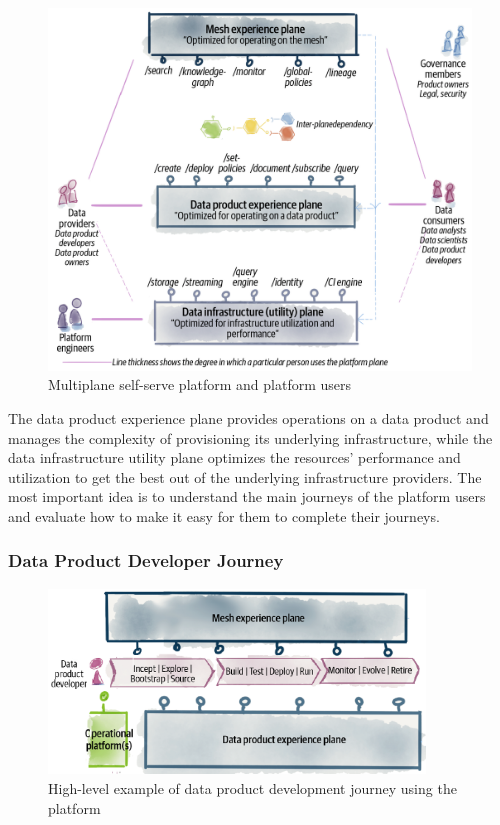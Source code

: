 \documentclass[12pt, a4paper]{book}
\begin{document}
\begin{figure}[h]
	\begin{framed}
		\centering
		\includegraphics[width=12cm]{multiplane.png}
		\caption{Multiplane self-serve platform and platform users}
		\label{multiplane}
	\end{framed}
	\vspace{-.5cm}
\end{figure}

The data product experience plane provides operations on a data product and manages the complexity of provisioning its underlying infrastructure, while the data infrastructure utility plane optimizes the resources' performance and utilization to get the best out of the underlying infrastructure providers. The most important idea is to understand the main journeys of the platform users and evaluate how to make it easy for them to complete their journeys.
\vspace{-.3cm}
\subsubsection*{Data Product Developer Journey}
\begin{figure}[h]
	\begin{framed}
		\centering
		\includegraphics[width=10cm]{DataProductDevJourney.png}
		\caption{High-level example of data product development journey using the platform}
		\label{DataProductDevJourney}
	\end{framed}
\end{figure}
\end{document}
